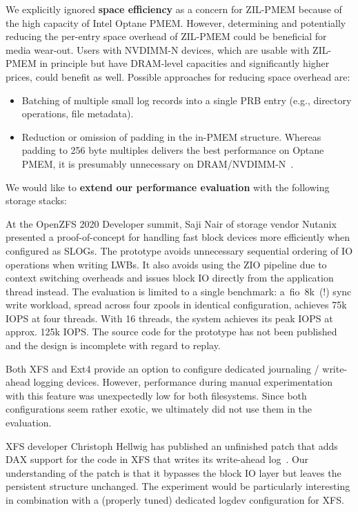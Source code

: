 \documentclass[12pt,a4paper,twoside]{book}
\begin{document}
We explicitly ignored \textbf{space efficiency} as a concern for ZIL-PMEM because of the high capacity of Intel Optane PMEM.
However, determining and potentially reducing the per-entry space overhead of ZIL-PMEM could be beneficial for media wear-out.
Users with NVDIMM-N devices, which are usable with ZIL-PMEM in principle but have DRAM-level capacities and significantly higher prices, could benefit as well.
Possible approaches for reducing space overhead are:
\begin{itemize}[noitemsep]
    \item Batching of multiple small log records into a single PRB entry (e.g., directory operations, file metadata).
    \item Reduction or omission of padding in the in-PMEM structure.
        Whereas padding to 256 byte multiples delivers the best performance on Optane PMEM, it is presumably unnecessary on DRAM/NVDIMM-N~\cite{yangEmpiricalGuideBehavior2020}.
\end{itemize}

We would like to \textbf{extend our performance evaluation} with the following storage stacks:
\begin{description}[noitemsep,leftmargin=1.5cm,labelindent=1cm]
    \item[ZIL ZIO Bypass By Saji Nair]
    At the OpenZFS 2020 Developer summit, Saji Nair of storage vendor Nutanix presented a proof-of-concept for handling fast block devices more efficiently when configured as SLOGs.
    The prototype avoids unnecessary sequential ordering of IO operations when writing LWBs.
    It also avoids using the ZIO pipeline due to context switching overheads and issues block IO directly from the application thread instead.
    The evaluation is limited to a single benchmark: a~fio~8k~(!) sync write workload, spread across four zpools in identical configuration, achieves 75k IOPS at four threads.
    With 16 threads, the system achieves its peak IOPS at approx. 125k IOPS.
    The source code for the prototype has not been published and the design is incomplete with regard to replay.~\cite{openzfsZILPerformanceImprovements2020}

    \item[Ext4 journal\_dev / XFS logdev] Both XFS and Ext4 provide an option to configure dedicated journaling / write-ahead logging devices.
        However, performance during manual experimentation with this feature was unexpectedly low for both filesystems.
        Since both configurations seem rather exotic, we ultimately did not use them in the evaluation.

    \item[XFS DAX Log Patch] XFS developer Christoph Hellwig has published an unfinished patch that adds DAX support for the code in XFS that writes its write-ahead log~\cite{LKMLChristophHellwig}.
        Our understanding of the patch is that it bypasses the block IO layer but leaves the persistent structure unchanged.
        The experiment would be particularly interesting in combination with a (properly tuned) dedicated logdev configuration for XFS.
\end{description}
\end{document}
